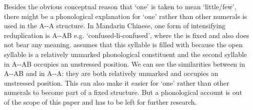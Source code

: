 Besides the obvious conceptual reason that   `one' is taken to mean `little/few',
there might be a phonological explanation for   `one' rather than other numerals is used in the A--A structure.
In Mandarin Chinese, one form of intensifying reduplication is A--AB e.g.  `confused-li-confused',
where the  is fixed and also does not bear any meaning.
\citet[137]{Sui2018} assumes that this syllable is filled with  because the open syllable  is a relatively unmarked phonological constituent \citep{Yip1992}
and the second syllable in A--AB occupies an unstressed position.
We can see the similarities between  in A--AB and  in A--A: they are both relatively unmarked and occupies an unstressed position.
This can also make it easier for   `one' rather than other numerals to become part of a fixed structure.
But a phonological account is out of the scope of this paper and has to be left for further research.

